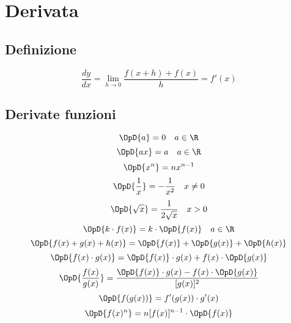\chapter{Derivata}
\section{Definizione}
\begin{equation*}
\dfrac{dy}{dx}=\lim_{h \to 0}\dfrac{f(x+h)+f(x)}{h}=f'(x)
\end{equation*}
\section{Derivate funzioni}
\begin{equation*}
\OpD{a}=0\quad a\in\R
\end{equation*}
\begin{equation*}
\OpD{ax}=a\quad a\in\R
\end{equation*}
\begin{equation*}
\OpD{x^n}=nx^{n-1}
\end{equation*}
\begin{equation*}
\OpD{\dfrac{1}{x}}=-\dfrac{1}{x^2}\quad x\neq 0
\end{equation*}
\begin{equation*}
\OpD{\sqrt{x}}=\dfrac{1}{2\sqrt{x}}\quad x> 0
\end{equation*}
\begin{equation*}
\OpD{k\cdot f( x )}=k\cdot\OpD{f(x)}\quad a\in\R
\end{equation*}
\begin{equation*}
\OpD{f( x )+g( x )+h( x )}=\OpD{f( x )}+\OpD{g( x )}+\OpD{h( x )}
\end{equation*}
\begin{equation*}
\OpD{f( x )\cdot g( x )}=\OpD{f( x )}\cdot g( x )+f( x )\cdot\OpD{g( x )}
\end{equation*}
\begin{equation*}
\OpD{\dfrac{f( x )}{g( x )}}=\dfrac{\OpD{f( x )}\cdot g( x )-f( x )\cdot\OpD{g( x )}} {[g( x )]^2}
\end{equation*}
\begin{equation*}
\OpD{f(g(x))}=f'(g(x))\cdot g'(x)
\end{equation*}
\begin{equation*}
\OpD{f(x)^n}=n[f(x)]^{n-1}\cdot \OpD{f(x)}
\end{equation*}